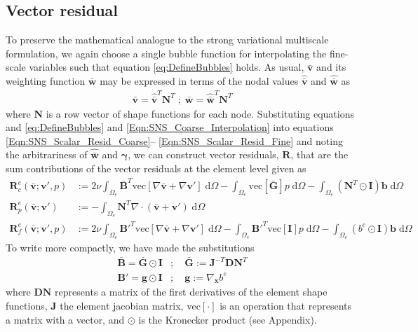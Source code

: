 \documentclass[11pt]{amsart}
\begin{document}
\subsection{Vector residual}
To preserve the mathematical analogue to the strong variational multiscale formulation, we again choose a single bubble function for interpolating the fine-scale variables such that equation \eqref{eq:DefineBubbles} holds.  As usual, $\bar{\boldsymbol{v}}$ and its weighting function $\bar{\boldsymbol{w}}$ may be expressed in terms of the nodal values $\hat{\bar{\boldsymbol{v}}}$ and $\hat{\bar{\boldsymbol{w}}}$ as
\begin{align}
  \label{Eqn:SNS_Coarse_Interpolation}
\bar{\boldsymbol{v}} = \hat{\bar{\boldsymbol{v}}}^T \boldsymbol{N}^T \; ; \; \bar{\boldsymbol{w}} = \hat{\bar{\boldsymbol{w}}}^T \boldsymbol{N}^T
\end{align}
where $\boldsymbol{N}$ is a row vector of shape functions for each node.
Substituting equations and \eqref{eq:DefineBubbles} and \eqref{Eqn:SNS_Coarse_Interpolation} into equations \eqref{Eqn:SNS_Scalar_Resid_Coarse}-- \eqref{Eqn:SNS_Scalar_Resid_Fine} and noting the arbitrariness of $\hat{\bar{\boldsymbol{w}}}$ and $\boldsymbol{\gamma}$, we can construct vector residuals, $\boldsymbol{R}$, that are the sum contributions of the vector residuals at the element level given as
\begin{align}
  \label{Eqn:SNS_Coarse_Resid_Vec}
\boldsymbol{R}^e_c(\bar{\boldsymbol{v}};\boldsymbol{v}',p) & := 2\nu \int_{\Omega_e}  \bar{\boldsymbol{B}}^T\mathrm{vec}[\nabla \bar{\boldsymbol{v}} + \nabla \boldsymbol{v}'] \; \mathrm{d} \Omega  - \int_{\Omega_e} \mathrm{vec}[\bar{\boldsymbol{G}}]p \; \mathrm{d} \Omega - \int_{\Omega_e} (\boldsymbol{N}^T\odot \boldsymbol{I})\boldsymbol{b} \; \mathrm{d} \Omega \\
\label{Eqn:SNS_Coarse_Resid_Vec_2}
\boldsymbol{R}^e_p(\bar{\boldsymbol{v}};\boldsymbol{v}') & := - \int_{\Omega_e} \boldsymbol{N}^T \nabla \cdot (\bar{\boldsymbol{v}} + \boldsymbol{v}') \; \mathrm{d} \Omega \\
\label{Eqn:SNS_Fine_Resid_Vec}
\boldsymbol{R}^e_f(\bar{\boldsymbol{v}};\boldsymbol{v}',p) & := 2\nu \int_{\Omega_e}  {\boldsymbol{B}'}^T
\mathrm{vec}[\nabla \bar{\boldsymbol{v}} + \nabla \boldsymbol{v}'] \; \mathrm{d} \Omega - \int_{\Omega_e}  {\boldsymbol{B}'}^T\mathrm{vec}[\boldsymbol{I}]p \; \mathrm{d} \Omega - \int_{\Omega_e} ( b^e \odot \boldsymbol{I})\boldsymbol{b} \; \mathrm{d} \Omega
\end{align}
To write more compactly, we have made the substitutions
\begin{align}
\bar{\boldsymbol{B}} = \bar{\boldsymbol{G}} \odot \boldsymbol{I}&; \quad  \bar{\boldsymbol{G}} := \boldsymbol{J}^{-T}\boldsymbol{DN}^T \nonumber \\
\boldsymbol{B}' = \boldsymbol{g} \odot \boldsymbol{I}&; \quad  \boldsymbol{g} := \nabla_{\boldsymbol{x}} b^e
\end{align}
where $\boldsymbol{DN}$ represents a matrix of the first derivatives of the element shape functions,  $\boldsymbol{J}$ the element jacobian matrix, $\mathrm{vec}[\cdot]$ is an operation that represents a matrix with a vector, and $\odot$ is the Kronecker product \cite{Graham} (see Appendix). 
\end{document}
